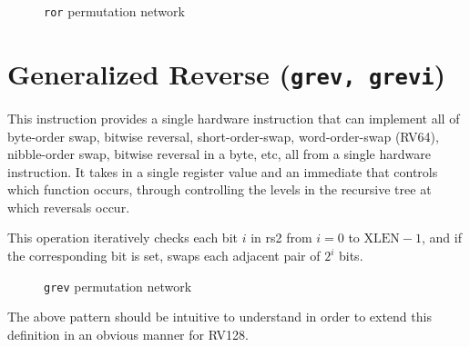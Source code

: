 \begin{figure}[t]
\begin{center}

\end{center}
\caption{\texttt{ror} permutation network}
\label{permnet-ror}
\end{figure}

\section{Generalized Reverse (\texttt{grev,\ grevi})}
\label{grev}

This instruction provides a single hardware instruction that can implement all
of byte-order swap, bitwise reversal, short-order-swap, word-order-swap
(RV64), nibble-order swap, bitwise reversal in a byte, etc, all from a single
hardware instruction. It takes in a single register value and an immediate that
controls which function occurs, through controlling the levels in the recursive
tree at which reversals occur.

This operation iteratively checks each bit $i$ in rs2 from $i=0$ to
$\textrm{XLEN}-1$, and if the corresponding bit is set, swaps each adjacent
pair of $2^i$ bits.

\begin{figure}[t]
\begin{center}

\end{center}
\caption{\texttt{grev} permutation network}
\label{permnet-grev}
\end{figure}



The above pattern should be intuitive to understand in order to extend
this definition in an obvious manner for RV128.

